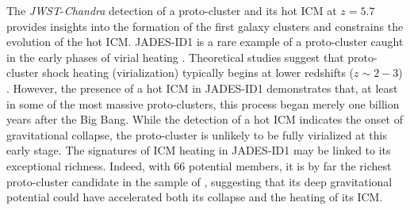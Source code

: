\documentclass[pdflatex,sn-mathphys-num]{sn-jnl}
\theoremstyle{thmstyleone}
\theoremstyle{thmstyletwo}
\theoremstyle{thmstylethree}
\begin{document}
The \textit{JWST}-\textit{Chandra} detection of a proto-cluster and its hot ICM at $z=5.7$ provides insights into the formation of the first galaxy clusters and constrains the evolution of the hot ICM. JADES-ID1 is a rare example of a proto-cluster caught in the early phases of virial heating \cite{2014MNRAS.439.2146C,2024MNRAS.527.1033B}. Theoretical studies suggest that proto-cluster shock heating (virialization) typically begins at lower redshifts ($z\sim2-3$) \cite{2013ApJ...779..127C}. However, the presence of a hot ICM in JADES-ID1 demonstrates that, at least in some of the most massive proto-clusters, this process began merely one billion years after the Big Bang. While the detection of a hot ICM indicates the onset of gravitational collapse, the proto-cluster is unlikely to be fully virialized at this early stage. The signatures of ICM heating in JADES-ID1 may be linked to its exceptional richness. Indeed, with 66 potential members, it is by far the richest proto-cluster candidate in the sample of \cite{2025MNRAS.539.1796L}, suggesting that its deep gravitational potential could have accelerated both its collapse and the heating of its ICM.
\end{document}
